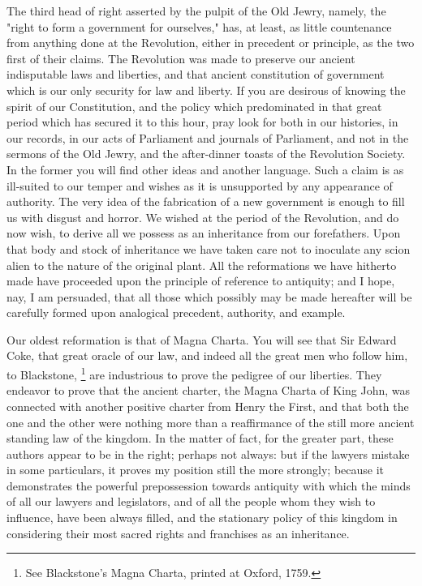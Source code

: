 The third head of right asserted by the pulpit of the Old Jewry, namely, the "right to form a government for ourselves," has, at least, as little countenance from anything done at the Revolution, either in precedent or principle, as the two first of their claims. The Revolution was made to preserve our ancient indisputable laws and liberties, and that ancient constitution of government which is our only security for law and liberty. If you are desirous of knowing the spirit of our Constitution, and the policy which predominated in that great period which has secured it to this hour, pray look for both in our histories, in our records, in our acts of Parliament and journals of Parliament, and not in the sermons of the Old Jewry, and the after-dinner toasts of the Revolution Society. In the former you will find other ideas and another language. Such a claim is as ill-suited to our temper and wishes as it is unsupported by any appearance of authority. The very idea of the fabrication of a new government is enough to fill us with disgust and horror. We wished at the period of the Revolution, and do now wish, to derive all we possess as an inheritance from our forefathers. Upon that body and stock of inheritance we have taken care not to inoculate any scion alien to the nature of the original plant. All the reformations we have hitherto made have proceeded upon the principle of reference to antiquity; and I hope, nay, I am persuaded, that all those which possibly may be made hereafter will be carefully formed upon analogical precedent, authority, and example.

Our oldest reformation is that of Magna Charta. You will see that Sir Edward Coke, that great oracle of our law, and indeed all the great men who follow him, to Blackstone,
\footnote{ See Blackstone's Magna Charta, printed at Oxford, 1759.}
 are industrious to prove the pedigree of our liberties. They endeavor to prove that the ancient charter, the Magna Charta of King John, was connected with another positive charter from Henry the First, and that both the one and the other were nothing more than a reaffirmance of the still more ancient standing law of the kingdom. In the matter of fact, for the greater part, these authors appear to be in the right; perhaps not always: but if the lawyers mistake in some particulars, it proves my position still the more strongly; because it demonstrates the powerful prepossession towards antiquity with which the minds of all our lawyers and legislators, and of all the people whom they wish to influence, have been always filled, and the stationary policy of this kingdom in considering their most sacred rights and franchises as an inheritance.

